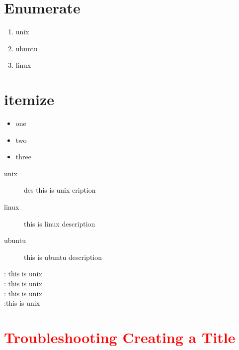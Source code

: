 \documentclass{article}
\begin{document}
	\section{Enumerate}
	\begin{enumerate}
		\item unix
		\item ubuntu
		\item linux
	\end{enumerate}
	\section{itemize}
	\begin{itemize}
		\item one
		\item two
		\item three
	\end{itemize}
	\begin{description}
		\item[unix] des this is unix cription
		\item[linux] this is linux description
		\item[ubuntu] this is ubuntu description
	\end{description}
	\large: this is unix\\
	\LARGE: this is unix\\
	\huge: this is unix\\
	\Huge :this is unix\\
	\section{\textcolor{red}{Troubleshooting Creating a Title}}
\end{document}
